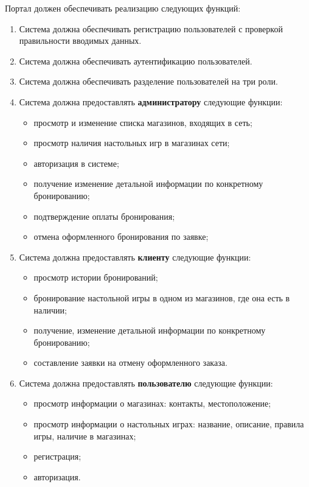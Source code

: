 Портал должен обеспечивать реализацию следующих функций:
\begin{enumerate}
    \item Система должна обеспечивать регистрацию пользователей с проверкой правильности вводимых данных.
    \item Система должна обеспечивать аутентификацию пользователей.
    \item Система должна обеспечивать разделение пользователей на три роли.
    \item Система должна предоставлять \textbf{администратору} следующие функции:
    \begin{itemize}
        \item просмотр и изменение списка магазинов, входящих в сеть;
        \item просмотр наличия настольных игр в магазинах сети;
        \item авторизация в системе;
        \item получение изменение детальной информации по конкретному бронированию;
        \item подтверждение оплаты бронирования;
        \item отмена оформленного бронирования по заявке;
    \end{itemize}
    \item Система должна предоставлять \textbf{клиенту} следующие функции:
    \begin{itemize}
        \item просмотр истории бронирований;
        \item бронирование настольной игры в одном из магазинов, где она есть в наличии;
        \item получение, изменение детальной информации по конкретному бронированию;
        \item составление заявки на отмену оформленного заказа.
    \end{itemize}
    \item Система должна предоставлять \textbf{пользователю} следующие функции:
    \begin{itemize}
        \item просмотр информации о магазинах: контакты,  местоположение;
        \item просмотр информации о настольных играх: название, описание, правила игры, наличие в магазинах;
        \item регистрация;
        \item авторизация.
    \end{itemize}
\end{enumerate}



